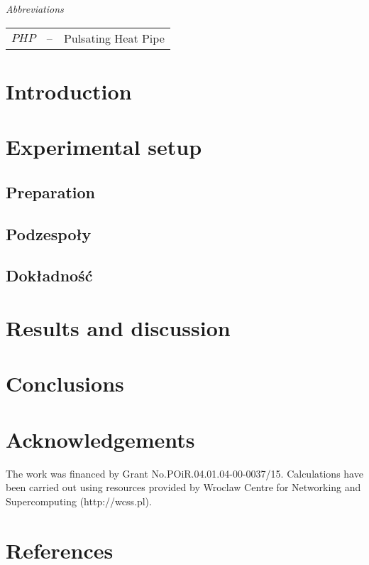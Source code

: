 \documentclass[review]{elsarticle}
\begin{document}
\textit{Abbreviations}

\begin{tabular}{l c p{10.5cm}}

  $PHP$ & -- & Pulsating Heat Pipe \\  
       
\end{tabular} 

\section{Introduction}
\label{sec:intro}

\section{Experimental setup}
\subsection{Preparation}
\subsection{Podzespoły}
\subsection{Dokładność}
\section{Results and discussion}
\label{sec:resdis}
\section{Conclusions}
\section*{Acknowledgements}
The work was financed by Grant No.POiR.04.01.04-00-0037/15. Calculations have been carried out using resources provided by Wroclaw Centre for Networking and Supercomputing (http://wcss.pl).

\section*{References} 


\end{document}
